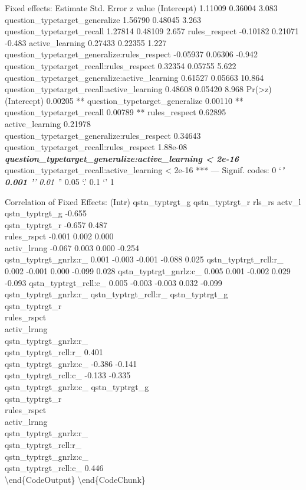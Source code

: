 \documentclass[10pt, letterpaper]{article}
\begin{document}
Fixed effects: Estimate Std. Error z value (Intercept) 1.11009 0.36004
3.083 question\_typetarget\_generalize 1.56790 0.48045 3.263
question\_typetarget\_recall 1.27814 0.48109 2.657 rules\_respect
-0.10182 0.21071 -0.483 active\_learning 0.27433 0.22355 1.227
question\_typetarget\_generalize:rules\_respect -0.05937 0.06306 -0.942
question\_typetarget\_recall:rules\_respect 0.32354 0.05755 5.622
question\_typetarget\_generalize:active\_learning 0.61527 0.05663 10.864
question\_typetarget\_recall:active\_learning 0.48608 0.05420 8.968
Pr(\textgreater{}\textbar{}z\textbar{})\\(Intercept) 0.00205 **
question\_typetarget\_generalize 0.00110 ** question\_typetarget\_recall
0.00789 ** rules\_respect 0.62895\\active\_learning
0.21978\\question\_typetarget\_generalize:rules\_respect
0.34643\\question\_typetarget\_recall:rules\_respect 1.88e-08
\textbf{\emph{ question\_typetarget\_generalize:active\_learning
\textless{} 2e-16 }} question\_typetarget\_recall:active\_learning
\textless{} 2e-16 *** --- Signif. codes: 0 `\emph{\textbf{' 0.001 '}'
0.01 '}' 0.05 `.' 0.1 `' 1

Correlation of Fixed Effects: (Intr) qstn\_typtrgt\_g qstn\_typtrgt\_r
rls\_rs actv\_l qstn\_typtrgt\_g -0.655\\qstn\_typtrgt\_r -0.657
0.487\\rules\_rspct -0.001 0.002 0.000\\activ\_lrnng -0.067 0.003 0.000
-0.254\\qstn\_typtrgt\_gnrlz:r\_ 0.001 -0.003 -0.001 -0.088 0.025
qstn\_typtrgt\_rcll:r\_ 0.002 -0.001 0.000 -0.099 0.028
qstn\_typtrgt\_gnrlz:c\_ 0.005 0.001 -0.002 0.029 -0.093
qstn\_typtrgt\_rcll:c\_ 0.005 -0.003 -0.003 0.032 -0.099
qstn\_typtrgt\_gnrlz:r\_ qstn\_typtrgt\_rcll:r\_
qstn\_typtrgt\_g\\qstn\_typtrgt\_r\\rules\_rspct\\activ\_lrnng\\qstn\_typtrgt\_gnrlz:r\_\\qstn\_typtrgt\_rcll:r\_
0.401\\qstn\_typtrgt\_gnrlz:c\_ -0.386 -0.141\\qstn\_typtrgt\_rcll:c\_
-0.133 -0.335\\ qstn\_typtrgt\_gnrlz:c\_
qstn\_typtrgt\_g\\qstn\_typtrgt\_r\\rules\_rspct\\activ\_lrnng\\qstn\_typtrgt\_gnrlz:r\_\\qstn\_typtrgt\_rcll:r\_\\qstn\_typtrgt\_gnrlz:c\_\\qstn\_typtrgt\_rcll:c\_
0.446\\\textbackslash{}end\{CodeOutput\}
\textbackslash{}end\{CodeChunk\}
\end{document}
